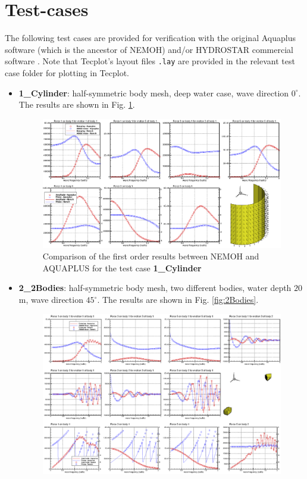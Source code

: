 \documentclass[12pt,a4paper,titlepage]{article}
\begin{document}
\section{Test-cases}\label{Sec:Testcase}
The following test cases are provided for verification with the original Aquaplus software (which is the ancestor of NEMOH) and/or HYDROSTAR commercial software \cite{HYDROSTAR}. Note that Tecplot's layout files \texttt{.lay} are provided in the relevant test case folder for plotting in Tecplot.
\begin{itemize}
\item {\textbf{1\_Cylinder}}: half-symmetric body mesh, deep water case, wave direction $0^{\circ}$. The results are shown in Fig. \ref{fig:Cylinder}. 
\begin{figure}[h!t]
\centering
\includegraphics[width=\textwidth,trim = 0mm 0mm 0mm 0mm, clip]{figures/Ver_Cylinder.eps}
\caption{Comparison of the first order results between NEMOH and AQUAPLUS for the test case \textbf{1\_Cylinder}}\label{fig:Cylinder}
\end{figure}
\item \textbf{2\_2Bodies}: half-symmetric body mesh, two different bodies, water depth $20$ m, wave direction $45^{\circ}$. The results are shown in Fig. \ref{fig:2Bodies}.
\begin{figure}[h!t]
\centering
\includegraphics[width=\textwidth,trim = 0mm 0mm 0mm 0mm, clip]{figures/Ver_2Bodies.eps}	

\end{figure}
\end{itemize}
\end{document}
